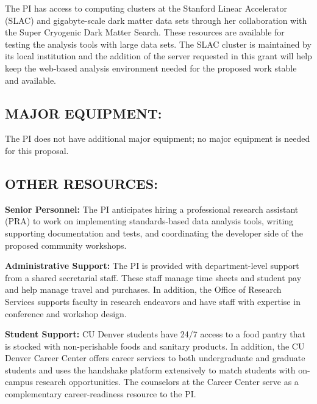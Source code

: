 \documentclass[11pt]{article}
\def\ni{\noindent}
\def\bs{\bigskip}
\newcommand{\NEXUS}{{\small NEXUS}}
\newcommand{\CDMS}{{\small CDMS}}
\begin{document}
\bs
\ni {\bf Other Facilities:}
\ni
The PI has access to computing clusters at the Stanford Linear Accelerator (SLAC) and gigabyte-scale dark matter data sets through her collaboration with the Super Cryogenic Dark Matter Search.  These resources are available for testing the analysis tools with large data sets.  The SLAC cluster is maintained by its local institution and the addition of the server requested in this grant will help keep the web-based analysis environment needed for the proposed work stable and available.

\subsection*{\small MAJOR EQUIPMENT:}

The PI does not have additional major equipment; no major equipment is needed for this proposal.

\bs
\subsection*{\small OTHER RESOURCES:}

\ni
{\bf Senior Personnel:} The PI anticipates hiring a professional research assistant (PRA) to work on implementing standards-based data analysis tools, writing supporting documentation and tests, and coordinating the developer side of the proposed community workshops.  %

{\bf Administrative Support:}  The PI is provided with department-level support from a shared secretarial staff.  These staff manage time sheets and student pay and help manage travel and purchases.  In addition, the Office of Research Services supports faculty in research endeavors and have staff with expertise in conference and workshop design.   

{\bf Student Support:}  CU Denver students have 24/7 access to a food pantry that is stocked with non-perishable foods and sanitary products.  In addition, the CU Denver Career Center offers career services to both undergraduate and graduate students and uses the handshake platform extensively to match students with on-campus research opportunities.  The counselors at the Career Center serve as a complementary career-readiness resource to the PI.




\end{document}
